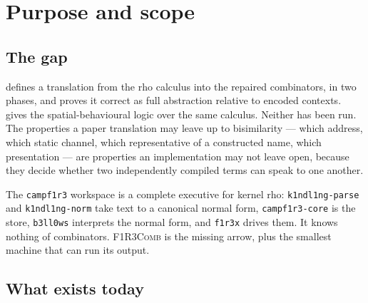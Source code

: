 \documentclass[11pt,a4paper]{article}
\newcommand{\code}[1]{\texttt{#1}}
\newcommand{\Comb}{\textsc{F1R3Comb}}
\theoremstyle{definition}
\theoremstyle{plain}
\begin{document}
\section{Purpose and scope}\label{sec:purpose}

\subsection{The gap}

\cite{draft3} defines a translation from the rho calculus into the repaired
combinators, in two phases, and proves it correct as full abstraction relative
to encoded contexts. \cite{logic} gives the spatial-behavioural logic over the
same calculus. Neither has been run. The properties a paper translation may
leave up to bisimilarity --- which address, which static channel, which
representative of a constructed name, which presentation --- are properties an
implementation may not leave open, because they decide whether two
independently compiled terms can speak to one another.

The \code{campf1r3} workspace is a complete executive for kernel rho:
\code{k1ndl1ng-parse} and \code{k1ndl1ng-norm} take text to a canonical normal
form, \code{campf1r3-core} is the store, \code{b3ll0ws} interprets the normal
form, and \code{f1r3x} drives them. It knows nothing of combinators. \Comb{}
is the missing arrow, plus the smallest machine that can run its output.

\subsection{What exists today}
\end{document}
